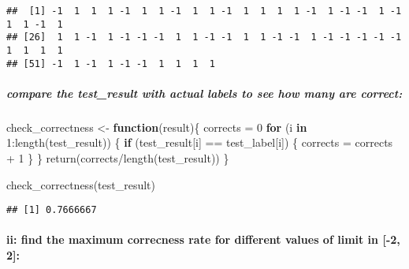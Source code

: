 \documentclass[
]{article}
\newenvironment{Shaded}{\begin{snugshade}}{\end{snugshade}}
\newcommand{\ControlFlowTok}[1]{\textcolor[rgb]{0.13,0.29,0.53}{\textbf{#1}}}
\newcommand{\DecValTok}[1]{\textcolor[rgb]{0.00,0.00,0.81}{#1}}
\newcommand{\FunctionTok}[1]{\textcolor[rgb]{0.00,0.00,0.00}{#1}}
\newcommand{\NormalTok}[1]{#1}
\newcommand{\OtherTok}[1]{\textcolor[rgb]{0.56,0.35,0.01}{#1}}
\newcommand{\SpecialCharTok}[1]{\textcolor[rgb]{0.00,0.00,0.00}{#1}}
\begin{document}
\begin{verbatim}
##  [1] -1  1  1  1 -1  1  1 -1  1  1 -1  1  1  1  1 -1  1 -1 -1  1 -1  1  1 -1  1
## [26]  1  1 -1  1 -1 -1 -1  1  1 -1 -1  1  1 -1 -1  1 -1 -1 -1 -1 -1  1  1  1  1
## [51] -1  1 -1  1 -1 -1  1  1  1  1
\end{verbatim}

\hypertarget{compare-the-test_result-with-actual-labels-to-see-how-many-are-correct}{%
\subparagraph{compare the test\_result with actual labels to see how
many are
correct:}\label{compare-the-test_result-with-actual-labels-to-see-how-many-are-correct}}

\begin{Shaded}
\begin{Highlighting}[]
\NormalTok{check\_correctness }\OtherTok{\textless{}{-}} \ControlFlowTok{function}\NormalTok{(result)\{}
\NormalTok{  corrects }\OtherTok{=} \DecValTok{0}
  \ControlFlowTok{for}\NormalTok{ (i }\ControlFlowTok{in} \DecValTok{1}\SpecialCharTok{:}\FunctionTok{length}\NormalTok{(test\_result)) \{}
    \ControlFlowTok{if}\NormalTok{ (test\_result[i] }\SpecialCharTok{==}\NormalTok{ test\_label[i]) \{}
\NormalTok{      corrects }\OtherTok{=}\NormalTok{ corrects }\SpecialCharTok{+} \DecValTok{1}
\NormalTok{    \}}
\NormalTok{  \}}
  \FunctionTok{return}\NormalTok{(corrects}\SpecialCharTok{/}\FunctionTok{length}\NormalTok{(test\_result))}
\NormalTok{\}}

\FunctionTok{check\_correctness}\NormalTok{(test\_result)}
\end{Highlighting}
\end{Shaded}

\begin{verbatim}
## [1] 0.7666667
\end{verbatim}

\hypertarget{ii-find-the-maximum-correcness-rate-for-different-values-of-limit-in--2-2}{%
\paragraph{ii: find the maximum correcness rate for different values of
limit in {[}-2,
2{]}:}\label{ii-find-the-maximum-correcness-rate-for-different-values-of-limit-in--2-2}}
\end{document}
